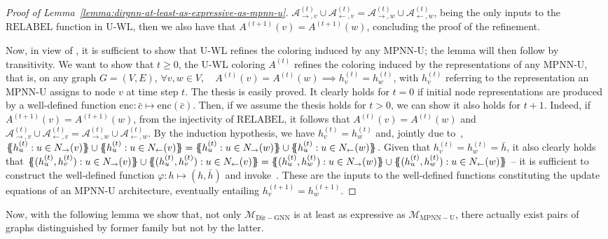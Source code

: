 \documentclass{article}
\newcommand{\inp}{\leftarrow}
\newcommand{\out}{\rightarrow}
\newcommand\oursacro{Dir-GNN}
\newcommand*{\ldblbrace}{\{\mskip-6mu\{}
\newcommand*{\rdblbrace}{\}\mskip-6mu\}}
\theoremstyle{plain}
\theoremstyle{definition}
\theoremstyle{remark}
\begin{document}
\begin{proof}[Proof of Lemma~\ref{lemma:dirgnn-at-least-as-expressive-as-mpnn-u}]
$\mathcal{A}^{(t)}_{\out,v} \cup \mathcal{A}^{(t)}_{\inp,v} = \mathcal{A}^{(t)}_{\out,w} \cup \mathcal{A}^{(t)}_{\inp,w}$, being the only inputs to the $\textrm{RELABEL}$ function in U-WL, then we also have that $A^{(t+1)}(v) = A^{(t+1)}(w)$, concluding the proof of the refinement.

    Now, in view of , it is sufficient to show that U-WL refines the coloring induced by any MPNN-U; the lemma will then follow by transitivity. We want to show that $t \geq 0$, the U-WL coloring $A^{(t)}$ refines the coloring induced by the representations of any MPNN-U, that is, on any graph $G = (V, E)$, $\forall v, w \in V, \quad A^{(t)}(v) = A^{(t)}(w) \implies h^{(t)}_v = h^{(t)}_w$, with $h^{(t)}_v$ referring to the representation an MPNN-U assigns to node $v$ at time step $t$. The thesis is easily proved. It clearly holds for $t=0$ if initial node representations are produced by a well-defined function $\textrm{enc}: \bar{c} \mapsto \textrm{enc}(\bar{c})$. Then, if we assume the thesis holds for $t > 0$, we can show it also holds for $t+1$. Indeed, if $A^{(t+1)}(v) = A^{(t+1)}(w)$, from the injectivity of $\textrm{RELABEL}$, it follows that $A^{(t)}(v) = A^{(t)}(w)$ and $\mathcal{A}^{(t)}_{\out,v} \cup \mathcal{A}^{(t)}_{\inp,v} = \mathcal{A}^{(t)}_{\out,w} \cup \mathcal{A}^{(t)}_{\inp,w}$. By the induction hypothesis, we have $h^{(t)}_v = h^{(t)}_w$ and, jointly due to~\citep[Lemma 2]{bevilacqua2022equivariant}, $\ldblbrace h^{(t)}_u : u \in N_\out(v)\rdblbrace \cup \ldblbrace h^{(t)}_u : u \in N_\inp(v)\rdblbrace = \ldblbrace h^{(t)}_u : u \in N_\out(w)\rdblbrace \cup \ldblbrace h^{(t)}_u : u \in N_\inp(w)\rdblbrace$. Given that $h^{(t)}_v = h^{(t)}_w = \bar{h}$, it also clearly holds that $\ldblbrace (h^{(t)}_u, h^{(t)}_v) : u \in N_\out(v)\rdblbrace \cup \ldblbrace (h^{(t)}_u, h^{(t)}_v) : u \in N_\inp(v)\rdblbrace = \ldblbrace (h^{(t)}_u, h^{(t)}_w) : u \in N_\out(w)\rdblbrace \cup \ldblbrace (h^{(t)}_u, h^{(t)}_w) : u \in N_\inp(w)\rdblbrace$ -- it is sufficient to construct the well-defined function $\varphi: h \mapsto (h, \bar{h})$ and invoke~\citep[Lemma 3]{bevilacqua2022equivariant}. These are the inputs to the well-defined functions constituting the update equations of an MPNN-U architecture, eventually entailing $h^{(t+1)}_v = h^{(t+1)}_w$.
\end{proof}

Now, with the following lemma we show that, not only $\mathcal{M}_\mathrm{\oursacro{}}$ is at least as expressive as $\mathcal{M}_\mathrm{MPNN-U}$, there actually exist pairs of graphs distinguished by former family but not by the latter.
\end{document}
